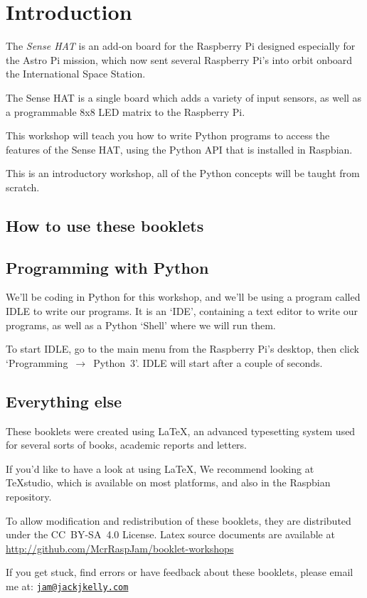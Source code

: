 \setcounter{section}{-1}
\section{Introduction}
	
	The \textit{Sense HAT} is an add-on board for the Raspberry Pi designed especially for the Astro Pi mission, which now sent several Raspberry Pi's into orbit onboard the International Space Station.
	
	The Sense HAT is a single board which adds a variety of input sensors, as well as a programmable 8x8 LED matrix to the Raspberry Pi.
	
	This workshop will teach you how to write Python programs to access the features of the Sense HAT, using the Python API that is installed in Raspbian.

	This is an introductory workshop, all of the Python concepts will be taught from scratch.
		
	\subsection*{How to use these booklets}
	
		
		
		
		
		
	\subsection*{Programming with Python}
	
		We'll be coding in Python for this workshop, and we'll be using a program called IDLE to write our programs.
		It is an `IDE', containing a text editor to write our programs, as well as a Python `Shell' where we will run them.
		
		To start IDLE\label{IDLE}, go to the main menu from the Raspberry Pi's desktop, then click \mbox{`Programming $\rightarrow$ Python 3'}. IDLE will start after a couple of seconds.
	
	\subsection*{Everything else}
	
		These booklets were created using \textrm{\LaTeX}, an advanced typesetting system used for several sorts of books, academic reports and letters.
		
		\ifprint\else If you'd like to have a look at using LaTeX, We recommend looking at \TeX studio, which is available on most platforms, and also in the Raspbian repository.\fi
		
		To allow modification and redistribution of these booklets, they are distributed under the \hbox{CC BY-SA 4.0} License.
		Latex source documents are available at \url{http://github.com/McrRaspJam/booklet-workshops}
		
		If you get stuck, find errors or have feedback about these booklets, please email me at:
		\href{mailto:jam@jackjkelly.com}{\texttt{jam@jackjkelly.com}}